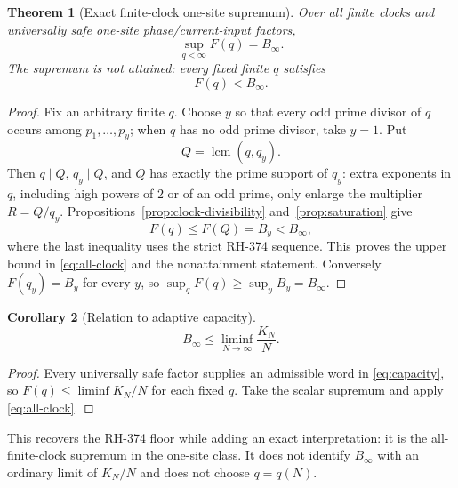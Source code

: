 \documentclass[11pt]{article}
\newtheorem{theorem}{Theorem}[section]
\newtheorem{corollary}[theorem]{Corollary}
\theoremstyle{definition}
\theoremstyle{remark}
\begin{document}
\begin{theorem}[Exact finite-clock one-site supremum]
Over all finite clocks and universally safe one-site phase/current-input
factors,
\begin{equation}
                 \boxed{\displaystyle\sup_{q<\infty}F(q)=B_\infty.}
 \label{eq:all-clock}
\end{equation}
The supremum is not attained: every fixed finite $q$ satisfies
\begin{equation}
                              F(q)<B_\infty.
 \label{eq:nonattainment}
\end{equation}
\end{theorem}

\begin{proof}
Fix an arbitrary finite $q$.  Choose $y$ so that every odd prime divisor of
$q$ occurs among $p_1,\ldots,p_y$; when $q$ has no odd prime divisor, take
$y=1$.  Put
\[
                         Q=\operatorname{lcm}(q,q_y).
\]
Then $q\mid Q$, $q_y\mid Q$, and $Q$ has exactly the prime support of $q_y$:
extra exponents in $q$, including high powers of $2$ or of an odd prime,
only enlarge the multiplier $R=Q/q_y$.
Propositions~\ref{prop:clock-divisibility} and~\ref{prop:saturation} give
\[
                         F(q)\le F(Q)=B_y<B_\infty,
\]
where the last inequality uses the strict RH-374 sequence.  This proves the
upper bound in \eqref{eq:all-clock} and the nonattainment statement.
Conversely $F(q_y)=B_y$ for every $y$, so
$\sup_qF(q)\ge\sup_yB_y=B_\infty$.
\end{proof}

\begin{corollary}[Relation to adaptive capacity]
\begin{equation}
                  B_\infty\le
                  \liminf_{N\to\infty}\frac{K_N}{N}.
 \label{eq:capacity-floor}
\end{equation}
\end{corollary}

\begin{proof}
Every universally safe factor supplies an admissible word in
\eqref{eq:capacity}, so $F(q)\le\liminf K_N/N$ for each fixed $q$.  Take the
scalar supremum and apply \eqref{eq:all-clock}.
\end{proof}

This recovers the RH-374 floor while adding an exact interpretation: it is
the all-finite-clock supremum in the one-site class.  It does not identify
$B_\infty$ with an ordinary limit of $K_N/N$ and does not choose $q=q(N)$.
\end{document}
